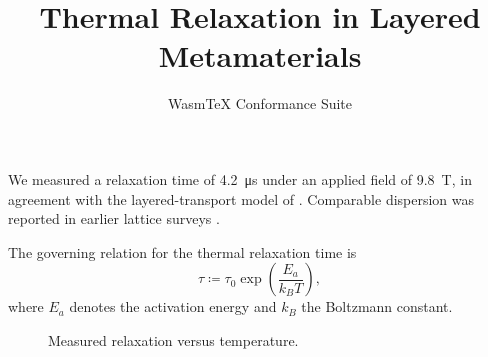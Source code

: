 \documentclass[11pt]{article}
\title{Thermal Relaxation in Layered Metamaterials}
\author{WasmTeX Conformance Suite}
\date{}
\begin{document}
\maketitle

We measured a relaxation time of \qty{4.2}{\micro\second} under an applied field
of \qty{9.8}{\tesla}, in agreement with the layered-transport model of
\citet{zhang2019}. Comparable dispersion was reported in earlier lattice surveys
\citep{nakamura2021}.

The governing relation for the thermal relaxation time is
\begin{equation}
  \tau \coloneqq \tau_0 \exp\!\left(\frac{E_a}{k_B T}\right),
\end{equation}
where $E_a$ denotes the activation energy and $k_B$ the Boltzmann constant.

\begin{figure}[h]
\centering
{}
\caption{Measured relaxation versus temperature.}
\end{figure}



\end{document}
